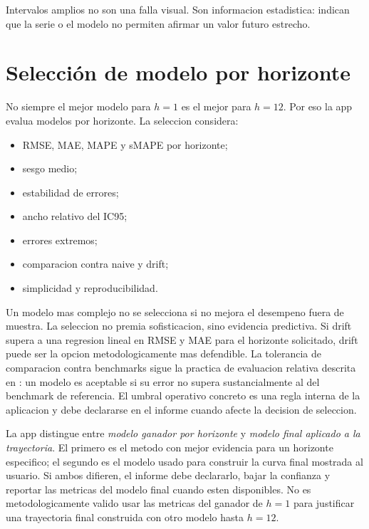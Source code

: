﻿\documentclass[12pt,letterpaper]{article}
\begin{document}
Intervalos amplios no son una falla visual. Son informacion estadistica: indican que la serie o el modelo no permiten afirmar un valor futuro estrecho.



\section{Selección de modelo por horizonte}

No siempre el mejor modelo para \(h=1\) es el mejor para \(h=12\). Por eso la app evalua modelos por horizonte. La seleccion considera:

\begin{itemize}[leftmargin=*]
    \item RMSE, MAE, MAPE y sMAPE por horizonte;
    \item sesgo medio;
    \item estabilidad de errores;
    \item ancho relativo del IC95;
    \item errores extremos;
    \item comparacion contra naive y drift;
    \item simplicidad y reproducibilidad.
\end{itemize}

Un modelo mas complejo no se selecciona si no mejora el desempeno fuera de muestra. La seleccion no premia sofisticacion, sino evidencia predictiva. Si drift supera a una regresion lineal en RMSE y MAE para el horizonte solicitado, drift puede ser la opcion metodologicamente mas defendible. La tolerancia de comparacion contra benchmarks sigue la practica de evaluacion relativa descrita en \citet{hyndman_koehler2006}: un modelo es aceptable si su error no supera sustancialmente al del benchmark de referencia. El umbral operativo concreto es una regla interna de la aplicacion y debe declararse en el informe cuando afecte la decision de seleccion.

La app distingue entre \emph{modelo ganador por horizonte} y \emph{modelo final aplicado a la trayectoria}. El primero es el metodo con mejor evidencia para un horizonte especifico; el segundo es el modelo usado para construir la curva final mostrada al usuario. Si ambos difieren, el informe debe declararlo, bajar la confianza y reportar las metricas del modelo final cuando esten disponibles. No es metodologicamente valido usar las metricas del ganador de \(h=1\) para justificar una trayectoria final construida con otro modelo hasta \(h=12\).
\end{document}
